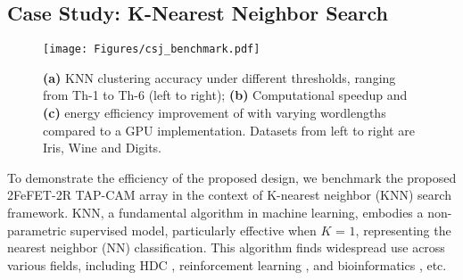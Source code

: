 







\subsection{Case Study: K-Nearest Neighbor Search}
\begin{figure*}
    \centering
    \texttt{[image: Figures/csj\_benchmark.pdf]}
    \caption{\textbf{(a)} KNN clustering accuracy under different \design thresholds, ranging from Th-1 to Th-6 (left to right); \textbf{(b)} Computational speedup and \textbf{(c)} energy efficiency improvement of \design with varying wordlengths compared to a GPU implementation. Datasets from left to right are Iris, Wine and Digits. }
    \label{fig:benchmark}
\end{figure*}
To demonstrate the efficiency of the proposed  design, we benchmark the proposed 2FeFET-2R TAP-CAM array in the context of  K-nearest neighbor (KNN) search framework. 
KNN, a fundamental algorithm in machine learning, embodies a non-parametric supervised model, particularly effective when $\textit{K = }1$, representing the nearest neighbor (NN) classification. 
This algorithm finds widespread use across various fields, including HDC  \cite{liu2022cosime, shou2023see}, reinforcement learning \cite{li2022associative}, and bioinformatics \cite{laguna2020seed}, etc.

